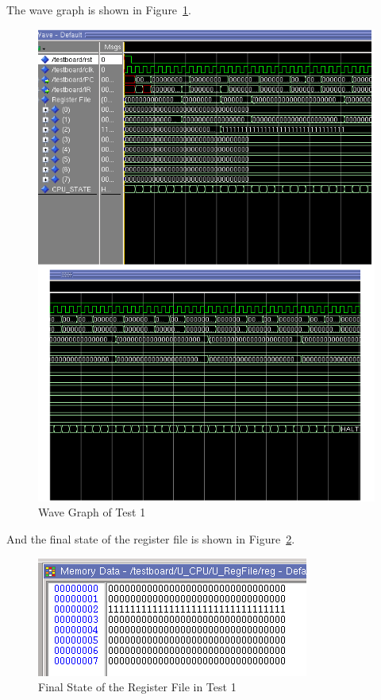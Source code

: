 \documentclass[a4paper]{article}
\begin{document}
The wave graph is shown in Figure~\ref{fig:wav_test1}.
\begin{figure}[ht!]
    \center
    \includegraphics[scale=0.5]{wav_test1}
    \caption{Wave Graph of Test 1}\label{fig:wav_test1}
\end{figure}

And the final state of the register file is shown in Figure~\ref{fig:reg_test1}.
\begin{figure}[ht!]
    \center
    \includegraphics[scale=0.6]{reg_test1}
    \caption{Final State of the Register File in Test 1}\label{fig:reg_test1}
\end{figure}
\end{document}
